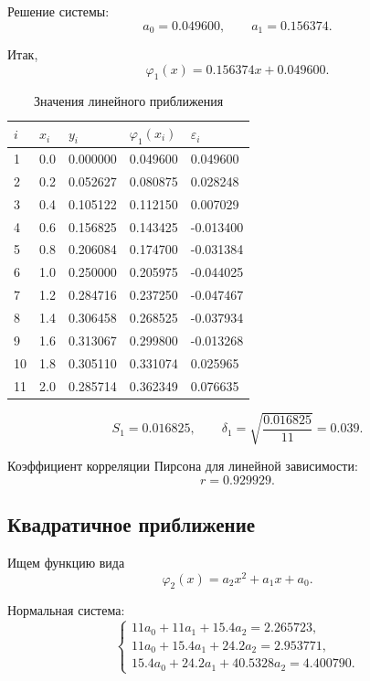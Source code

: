 \documentclass[12pt,a4paper]{article}
\begin{document}
Решение системы:
\[
  a_0=0.049600,\qquad a_1=0.156374.
\]

Итак,
\[
  \boxed{\varphi_1(x)=0.156374x+0.049600}.
\]

\begin{table}[H]
  \centering
  \caption{Значения линейного приближения}
  \begin{tabular}{C{0.8cm}C{1.4cm}C{2.2cm}C{2.4cm}C{2.2cm}}
    \toprule
    $i$ & $x_i$ & $y_i$ & $\varphi_1(x_i)$ & $\varepsilon_i$ \\
     & 0.0 & 0.000000 & 0.049600 & 0.049600 \\
    2 & 0.2 & 0.052627 & 0.080875 & 0.028248 \\
    3 & 0.4 & 0.105122 & 0.112150 & 0.007029 \\
    4 & 0.6 & 0.156825 & 0.143425 & -0.013400 \\
    5 & 0.8 & 0.206084 & 0.174700 & -0.031384 \\
    6 & 1.0 & 0.250000 & 0.205975 & -0.044025 \\
    7 & 1.2 & 0.284716 & 0.237250 & -0.047467 \\
    8 & 1.4 & 0.306458 & 0.268525 & -0.037934 \\
    9 & 1.6 & 0.313067 & 0.299800 & -0.013268 \\
    10 & 1.8 & 0.305110 & 0.331074 & 0.025965 \\
    11 & 2.0 & 0.285714 & 0.362349 & 0.076635 \\
    \bottomrule
  \end{tabular}
\end{table}

\[
  S_1=0.016825,\qquad \delta_1=\sqrt{\frac{0.016825}{11}}=\boxed{0.039}.
\]

Коэффициент корреляции Пирсона для линейной зависимости:
\[
  r=0.929929.
\]

\subsection{Квадратичное приближение}

Ищем функцию вида
\[
  \varphi_2(x)=a_2x^2+a_1x+a_0.
\]

Нормальная система:
\[
\begin{cases}
  11a_0+11a_1+15.4a_2=2.265723,\\
  11a_0+15.4a_1+24.2a_2=2.953771,\\
  15.4a_0+24.2a_1+40.5328a_2=4.400790.
\end{cases}
\]
\end{document}
